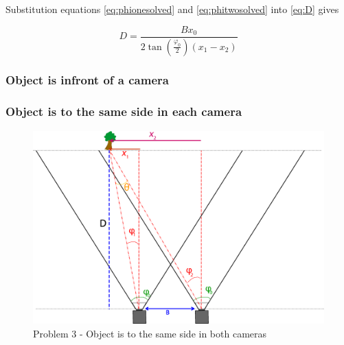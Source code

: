 Substitution equations \eqref{eq:phionesolved} and \eqref{eq:phitwosolved} into \eqref{eq:D} gives

\begin{equation} \label{eq:Distance1}
D = \frac{Bx_0}{2\tan(\frac{\varphi_0}{2})(x_1 - x_2)}
\end{equation}


\subsubsection{Object is infront of a camera}


\subsubsection{Object is to the same side in each camera}

\begin{figure}
\includegraphics[width=\textwidth,height=\textheight,keepaspectratio]{Figures/problem2.png}
\caption{Problem 3 - Object is to the same side in both cameras}
\label{problem_toleft}
\end{figure}
